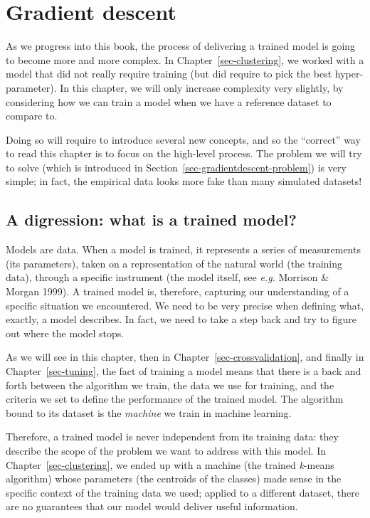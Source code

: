 \documentclass[
  letterpaper,
]{scrbook}
\begin{document}

\chapter{Gradient descent}\label{sec-gradientdescent}

As we progress into this book, the process of delivering a trained model
is going to become more and more complex. In
Chapter~\ref{sec-clustering}, we worked with a model that did not really
require training (but did require to pick the best hyper-parameter). In
this chapter, we will only increase complexity very slightly, by
considering how we can train a model when we have a reference dataset to
compare to.

Doing so will require to introduce several new concepts, and so the
``correct'' way to read this chapter is to focus on the high-level
process. The problem we will try to solve (which is introduced in
Section~\ref{sec-gradientdescent-problem}) is very simple; in fact, the
empirical data looks more fake than many simulated datasets!

\section{A digression: what is a trained
model?}\label{sec-gradientdescent-trainedmodel}

Models are data. When a model is trained, it represents a series of
measurements (its parameters), taken on a representation of the natural
world (the training data), through a specific instrument (the model
itself, see \emph{e.g.} Morrison \& Morgan 1999). A trained model is,
therefore, capturing our understanding of a specific situation we
encountered. We need to be very precise when defining what, exactly, a
model describes. In fact, we need to take a step back and try to figure
out where the model stops.

As we will see in this chapter, then in
Chapter~\ref{sec-crossvalidation}, and finally in
Chapter~\ref{sec-tuning}, the fact of training a model means that there
is a back and forth between the algorithm we train, the data we use for
training, and the criteria we set to define the performance of the
trained model. The algorithm bound to its dataset is the \emph{machine}
we train in machine learning.

Therefore, a trained model is never independent from its training data:
they describe the scope of the problem we want to address with this
model. In Chapter~\ref{sec-clustering}, we ended up with a machine (the
trained \emph{k}-means algorithm) whose parameters (the centroids of the
classes) made sense in the specific context of the training data we
used; applied to a different dataset, there are no guarantees that our
model would deliver useful information.
\end{document}
